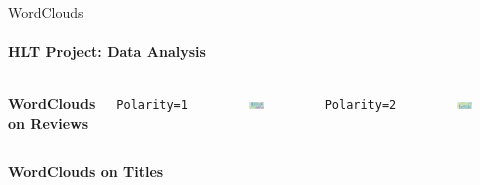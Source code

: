 \documentclass{beamer}
\theoremstyle{definition}
\theoremstyle{plain}
\begin{document}
\begin{frame}{WordClouds}
\framesubtitle{HLT Project: Data Analysis}
{\small

\begin{columns}
    \center
    \textbf{WordClouds on Reviews}
    
    \center
    \texttt{Polarity=1}
    \begin{figure}
        \centering
        \includegraphics[scale=0.12, trim=0 0 0 1cm]{Figures/wordcloud_review1.1.png}
    \end{figure}

    \center
    \texttt{Polarity=2}
    \begin{figure}
        \centering
        \includegraphics[scale=0.12, trim=0 0 0 1cm]{Figures/wordlcloud_review1.2.png}
    \end{figure}
\end{columns}

\begin{columns}
    \center
    \textbf{WordClouds on Titles}
    

\end{columns}}
\end{frame}
\end{document}
